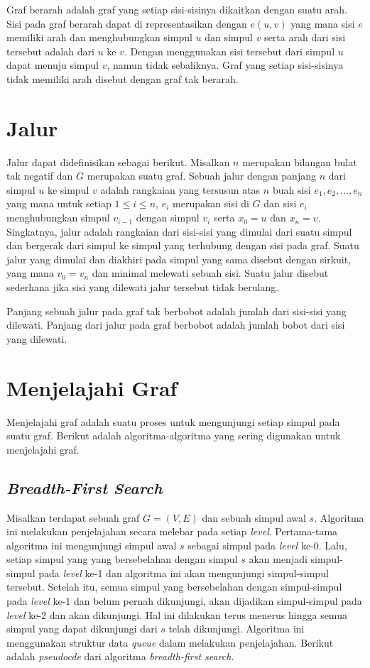 Graf berarah adalah graf yang setiap sisi-sisinya dikaitkan dengan suatu arah. Sisi pada graf
berarah dapat di representasikan dengan $e (u, v)$ yang mana sisi $e$ memiliki arah dan
menghubungkan simpul $u$ dan simpul $v$ serta arah dari sisi tersebut adalah dari $u$ ke $v$. Dengan
menggunakan sisi tersebut dari simpul $u$ dapat menuju simpul $v$, namun tidak sebaliknya. Graf yang
setiap sisi-sisinya tidak memiliki arah disebut dengan graf tak berarah.

\section{Jalur}

Jalur dapat didefinisikan sebagai berikut. Misalkan $n$ merupakan bilangan bulat tak negatif dan $G$
merupakan suatu graf. Sebuah jalur dengan panjang $n$ dari simpul $u$ ke simpul $v$ adalah rangkaian
yang tersusun atas $n$ buah sisi $e_{1}, e_{2}, ..., e_{n}$ yang mana untuk setiap $1 \leq i \leq
n$, $e_{i}$ merupakan sisi di $G$ dan sisi $e_{i}$ menghubungkan simpul $v_{i-1}$ dengan simpul
$v_{i}$ serta $x_{0} = u$ dan $x_{n} = v$. Singkatnya, jalur adalah rangkaian dari sisi-sisi yang
dimulai dari suatu simpul dan bergerak dari simpul ke simpul yang terhubung dengan sisi pada graf.
Suatu jalur yang dimulai dan diakhiri pada simpul yang sama disebut dengan sirkuit, yang mana $v_{0}
= v_{n}$ dan minimal melewati sebuah sisi. Suatu jalur disebut sederhana jika sisi yang dilewati
jalur tersebut tidak berulang.

Panjang sebuah jalur pada graf tak berbobot adalah jumlah dari sisi-sisi yang dilewati. 
Panjang dari jalur pada graf berbobot adalah jumlah bobot dari sisi yang dilewati.

\section{Menjelajahi Graf}

Menjelajahi graf adalah suatu proses untuk mengunjungi setiap simpul pada suatu graf. 
Berikut adalah algoritma-algoritma yang sering digunakan untuk menjelajahi graf.

  \subsection{\textit{Breadth-First Search}} Misalkan terdapat sebuah graf $G = (V, E)$ dan sebuah
  simpul awal $s$. Algoritma ini melakukan penjelajahan secara melebar pada setiap \textit{level}.
  Pertama-tama algoritma ini mengunjungi simpul awal $s$ sebagai simpul pada \textit{level} ke-0.
  Lalu, setiap simpul yang yang bersebelahan dengan simpul $s$ akan menjadi simpul-simpul pada
  \textit{level} ke-1 dan algoritma ini akan mengunjungi simpul-simpul tersebut. Setelah itu, semua
  simpul yang bersebelahan dengan simpul-simpul pada \textit{level} ke-1 dan belum pernah
  dikunjungi, akan dijadikan simpul-simpul pada \textit{level} ke-2 dan akan dikunjungi. Hal ini
  dilakukan terus menerus hingga semua simpul yang dapat dikunjungi dari $s$  telah dikunjungi.
  Algoritma ini menggunakan struktur data \textit{queue} dalam melakukan penjelajahan. Berikut
  adalah \textit{pseudocde} dari algoritma \textit{breadth-first search}.

